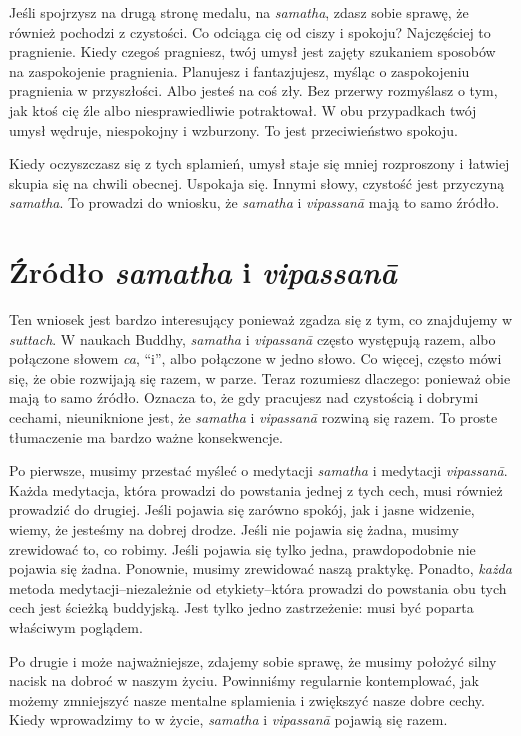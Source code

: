 \documentclass[12pt,openany]{book}
\begin{document}
Jeśli spojrzysz na drugą stronę medalu, na \textit{samatha}, zdasz sobie sprawę, że również pochodzi z czystości. Co odciąga cię od ciszy i spokoju? Najczęściej to pragnienie. Kiedy czegoś pragniesz, twój umysł jest zajęty szukaniem sposobów na zaspokojenie pragnienia. Planujesz i fantazjujesz, myśląc o zaspokojeniu pragnienia w przyszłości. Albo jesteś na coś zły. Bez przerwy rozmyślasz o tym, jak ktoś cię źle albo niesprawiedliwie potraktował. W obu przypadkach twój umysł wędruje, niespokojny i wzburzony. To jest przeciwieństwo spokoju.

Kiedy oczyszczasz się z tych splamień, umysł staje się mniej rozproszony i łatwiej skupia się na chwili obecnej. Uspokaja się. Innymi słowy, czystość jest przyczyną \textit{samatha}. To prowadzi do wniosku, że \textit{samatha} i \textit{vipassanā} mają to samo źródło.

\chapter*{Źródło \textit{samatha} i \textit{vipassanā}}

Ten wniosek jest bardzo interesujący ponieważ zgadza się z tym, co znajdujemy w \textit{suttach}. W naukach Buddhy, \textit{samatha} i \textit{vipassanā} często występują razem, albo połączone słowem \textit{ca}, “i”, albo połączone w jedno słowo. Co więcej, często mówi się, że obie rozwijają się razem, w parze. Teraz rozumiesz dlaczego: ponieważ obie mają to samo źródło. Oznacza to, że gdy pracujesz nad czystością i dobrymi cechami, nieuniknione jest, że \textit{samatha} i \textit{vipassanā} rozwiną się razem. To proste tłumaczenie ma bardzo ważne konsekwencje.

Po pierwsze, musimy przestać myśleć o medytacji \textit{samatha} i medytacji \textit{vipassanā}. Każda medytacja, która prowadzi do powstania jednej z tych cech, musi również prowadzić do drugiej. Jeśli pojawia się zarówno spokój, jak i jasne widzenie, wiemy, że jesteśmy na dobrej drodze. Jeśli nie pojawia się żadna, musimy zrewidować to, co robimy. Jeśli pojawia się tylko jedna, prawdopodobnie nie pojawia się żadna. Ponownie, musimy zrewidować naszą praktykę. Ponadto, \textit{każda} metoda medytacji–niezależnie od etykiety–która prowadzi do powstania obu tych cech jest ścieżką buddyjską. Jest tylko jedno zastrzeżenie: musi być poparta właściwym poglądem.

Po drugie i może najważniejsze, zdajemy sobie sprawę, że musimy położyć silny nacisk na dobroć w naszym życiu. Powinniśmy regularnie kontemplować, jak możemy zmniejszyć nasze mentalne splamienia i zwiększyć nasze dobre cechy. Kiedy wprowadzimy to w życie, \textit{samatha} i \textit{vipassanā} pojawią się razem.
\end{document}
